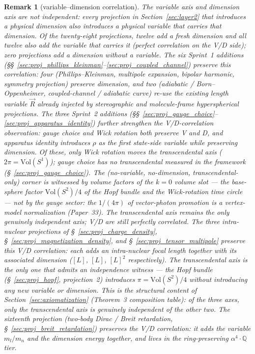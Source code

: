 \documentclass[11pt]{article}
\newtheorem{remark}{Remark}
\begin{document}
\begin{remark}[variable--dimension correlation]
\label{rem:vd_correlation}
The variable axis and dimension axis are not independent: every
projection in Section~\ref{sec:layer2} that introduces a physical
dimension also introduces a physical variable that carries that
dimension.  Of the twenty-eight projections, twelve add a fresh dimension and
all twelve also add the variable that carries it (perfect correlation
on the V/D side); zero projections add a dimension without a
variable.  The six Sprint~1 additions
(\S\S~\ref{sec:proj_phillips_kleinman}--\ref{sec:proj_coupled_channel})
preserve this correlation: four (Phillips--Kleinman, multipole
expansion, bipolar harmonic, symmetry projection) preserve dimension,
and two (adiabatic / Born--Oppenheimer, coupled-channel / adiabatic
curve) re-use the existing length variable $\vec{R}$ already injected
by stereographic and molecule-frame hyperspherical projections.
The three Sprint~2 additions
(\S\S~\ref{sec:proj_gauge_choice}--\ref{sec:proj_apparatus_identity})
further strengthen the V/D-correlation observation: gauge choice and
Wick rotation both preserve V and D, and apparatus identity introduces
$\rho$ as the first state-side variable while preserving dimension.
Of these, only Wick rotation moves the transcendental axis
($2\pi = \mathrm{Vol}(S^1)$); gauge choice has no transcendental
measured in the framework (\S~\ref{sec:proj_gauge_choice}).  The
(no-variable, no-dimension, transcendental-only) corner is witnessed by
volume factors of the $k = 0$ volume slot --- the base-sphere factor
$\mathrm{Vol}(S^2)/4$ of the Hopf bundle and the Wick-rotation time
circle --- not by the gauge sector: the
$1/(4\pi)$ of vector-photon promotion is a vertex-model normalization
(Paper~33).  The transcendental axis remains the only genuinely
independent axis; V/D are still perfectly correlated.  The three intra-nuclear projections of
\S~\ref{sec:proj_charge_density}, \S~\ref{sec:proj_magnetization_density},
and \S~\ref{sec:proj_tensor_multipole} preserve this V/D
correlation: each adds an intra-nuclear focal length together with
its associated dimension ($[L]$, $[L]$, $[L]^2$ respectively).  The transcendental axis is the only one that admits an
independence witness --- the Hopf bundle (\S~\ref{sec:proj_hopf},
projection~2) introduces $\pi = \mathrm{Vol}(S^2)/4$ without
introducing any new variable or dimension.  This is the structural content of
Section~\ref{sec:axiomatization} (Theorem~3 composition table):
of the three axes, only the transcendental axis is genuinely
independent of the other two.  The sixteenth projection
(two-body Dirac / Breit retardation,
\S~\ref{sec:proj_breit_retardation}) preserves the V/D correlation:
it adds the variable $m_l/m_n$ and the dimension energy together,
and lives in the ring-preserving $\alpha^4 \cdot \mathbb{Q}$ tier.
\end{remark}
\end{document}
